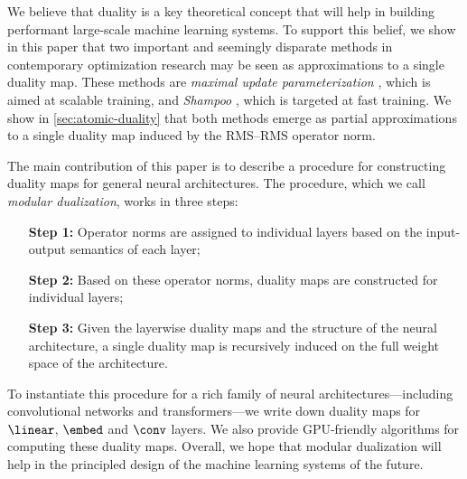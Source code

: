 We believe that duality is a key theoretical concept that will help in building performant large-scale machine learning systems. To support this belief, we show in this paper that two important and seemingly disparate methods in contemporary optimization research may be seen as approximations to a single duality map. These methods are \textit{maximal update parameterization} \citep{Yang2021TensorPI}, which is aimed at scalable training, and \textit{Shampoo} \citep{Shi2023DistributedShampoo}, which is targeted at fast training. We show in \cref{sec:atomic-duality} that both methods emerge as partial approximations to a single duality map induced by the RMS--RMS operator norm.

The main contribution of this paper is to describe a procedure for constructing duality maps for general neural architectures. The procedure, which we call \textit{modular dualization}, works in three steps:
\begin{itemize}[leftmargin=1.45cm, itemindent=0cm]
    \item[\textbf{Step 1:}] Operator norms are assigned to individual layers based on the input-output semantics of each layer;
    \item[\textbf{Step 2:}] Based on these operator norms, duality maps are constructed for individual layers;
    \item[\textbf{Step 3:}] Given the layerwise duality maps and the structure of the neural architecture, a single duality map is recursively induced on the full weight space of the architecture. 
\end{itemize}

To instantiate this procedure for a rich family of neural architectures---including convolutional networks and transformers---we write down duality maps for $\linear$, $\embed$ and $\conv$ layers. We also provide GPU-friendly algorithms for computing these duality maps. Overall, we hope that modular dualization will help in the principled design of the machine learning systems of the future.
